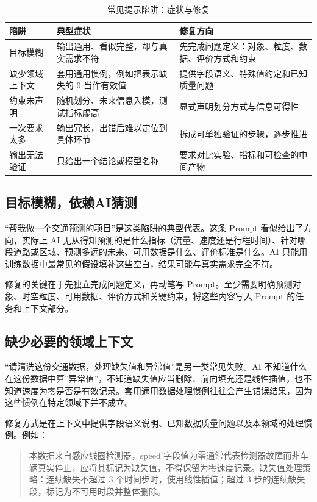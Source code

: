 \begin{table}[H]
\centering
\caption{常见提示陷阱：症状与修复}
\label{tab:ch02_traps}
\small
\begin{tabular}{L{3.0cm}L{5.0cm}L{5.0cm}}
\toprule
陷阱 & 典型症状 & 修复方向 \\
\midrule
目标模糊 & 输出通用、看似完整，却与真实需求不符 & 先完成问题定义：对象、粒度、数据、评价方式和约束 \\
缺少领域上下文 & 套用通用惯例，例如把表示缺失的 0 当作有效值 & 提供字段语义、特殊值约定和已知质量问题 \\
约束未声明 & 随机划分、未来信息入模，测试指标虚高 & 显式声明划分方式与信息可得性 \\
一次要求太多 & 输出冗长，出错后难以定位到具体环节 & 拆成可单独验证的步骤，逐步推进 \\
输出无法验证 & 只给出一个结论或模型名称 & 要求对比实验、指标和可检查的中间产物 \\
\bottomrule
\end{tabular}
\end{table}

\subsection{目标模糊，依赖AI猜测}

“帮我做一个交通预测的项目”是这类陷阱的典型代表。这条 Prompt 看似给出了方向，实际上 AI 无从得知预测的是什么指标（流量、速度还是行程时间）、针对哪段道路或区域、预测多远的未来、可用数据是什么、评价标准是什么。AI 只能用训练数据中最常见的假设填补这些空白，结果可能与真实需求完全不符。

修复的关键在于先独立完成问题定义，再动笔写 Prompt。至少需要明确预测对象、时空粒度、可用数据、评价方式和关键约束，将这些内容写入 Prompt 的任务和上下文部分。

\subsection{缺少必要的领域上下文}

“请清洗这份交通数据，处理缺失值和异常值”是另一类常见失败。AI 不知道什么在这份数据中算”异常值”，不知道缺失值应当删除、前向填充还是线性插值，也不知道速度为零是否是有效记录。套用通用数据处理惯例往往会产生错误结果，因为这些惯例在特定领域下并不成立。

修复方式是在上下文中提供字段语义说明、已知数据质量问题以及本领域的处理惯例。例如：

\begin{quote}
本数据来自感应线圈检测器，speed 字段值为零通常代表检测器故障而非车辆真实停止，应将其标记为缺失值，不得保留为零速度记录。缺失值处理策略：连续缺失不超过 3 个时间步时，使用线性插值；超过 3 步的连续缺失段，标记为不可用时段并整体删除。
\end{quote}

